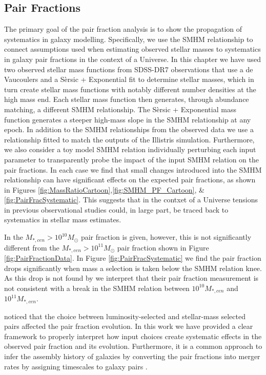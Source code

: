 \subsection{Pair Fractions}

The primary goal of the pair fraction analysis is to show the propagation of systematics in galaxy modelling. 
Specifically, we use the SMHM relationship to connect assumptions used when estimating observed stellar masses to systematics in galaxy pair fractions in the context of a \LCDM Universe. 
In this chapter we have used two observed stellar mass functions from SDSS-DR7 observations that use a de Vaucoulers and a S\`ersic + Exponential fit to determine stellar masses, which in turn create stellar mass functions with notably different number densities at the high mass end. Each stellar mass function then generates, through abundance matching, a different SMHM relationship. The S\`ersic + Exponential mass function generates a steeper high-mass slope in the SMHM relationship at any epoch.
In addition to the SMHM relationships from the observed data we use a relationship fitted to match the outputs of the Illistris simulation. Furthermore, we also consider a toy model SMHM relation individually perturbing each input parameter to transparently probe the impact of the input SMHM relation on the pair fractions.
In each case we find that small changes introduced into the SMHM relationship can have significant effects on the expected pair fractions, as shown in Figures \ref{fig:MassRatioCartoon},\ref{fig:SMHM_PF_Cartoon}, \& \ref{fig:PairFracSystematic}.
This suggests that in the contxet of a \LCDM Universe tensions in previous observational studies could, in large part, be traced back to systematics in stellar mass estimates.

In \citet{Mundy2017A3.5} the $M_{*,cen} > 10^{10} M_{\odot}$ pair fraction is given, however, this is not significantly different from the $M_{*,cen} > 10^{11} M_{\odot}$ pair fraction shown in Figure \ref{fig:PairFractionData}. In Figure \ref{fig:PairFracSystematic} we find the pair fraction drops significantly when mass a selection is taken below the SMHM relation knee. As this drop is not found by \citet{Mundy2017A3.5} we interpret that their pair fraction measurement is not consistent with a break in the SMHM relation between $10^{10} M_{*,cen}$ and $10^{11} M_{*,cen}$.

\citet{Man2016RESOLVING03} noticed that the choice between luminosity-selected and stellar-mass selected pairs affected the pair fraction evolution. In this work we have provided a clear framework to properly interpret how input choices create systematic effects in the observed pair fraction and its evolution. Furthermore, it is a common approach to infer the assembly history of galaxies by converting the pair fractions into merger rates by assigning timescales to galaxy pairs \citep{Conselice20033,Conselice2008TheField,Mundy2017A3.5}. 

